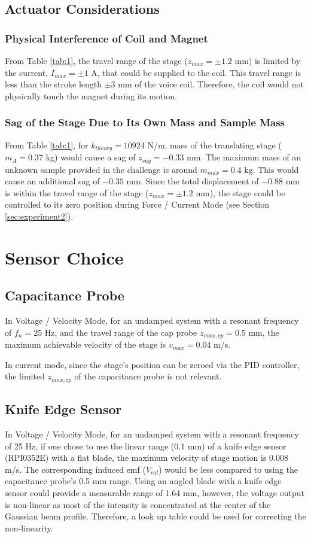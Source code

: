 \documentclass[12pt]{article}
\begin{document}
\subsection{Actuator Considerations}
\subsubsection{Physical Interference of Coil and Magnet}
From Table \ref{tab:1}, the travel range of the stage ($z_{max}= \pm 1.2$ mm) is limited by the current,  $I_{max}=\pm1$ A, that could be supplied to the coil. This travel range is less than the stroke length $\pm3$ mm \cite{hardwaremanual} of the voice coil. Therefore, the coil would not physically touch the magnet during its motion.  
\subsubsection{Sag of the Stage Due to Its Own Mass and Sample Mass}
From Table \ref{tab:1}, for $k_{theory}= 10924$ N/m, mass of the translating stage ($m_A  = 0.37$ kg) would cause a sag of $z_{sag}= - 0.33$ mm. The maximum mass of an unknown sample provided in the challenge is around $m_{max}= 0.4$ kg. This would cause an additional sag of $- 0.35$ mm.  Since the total displacement of $- 0.88$ mm is within the travel range of the stage ($z_{max}= \pm 1.2$ mm), the stage could be controlled to its zero position during Force / Current Mode (see Section \ref{sec:experiment2}).

\section{Sensor Choice}
\subsection{Capacitance Probe}
In Voltage / Velocity Mode, for an undamped system with a resonant frequency of $f_n = 25$ Hz, and the travel range of the cap probe $z_{max,cp}=0.5$ mm, the maximum achievable velocity of the stage is $v_{max}= 0.04$ m/s.

In current mode, since the stage’s position can be zeroed via the PID controller, the limited $z_{max,cp}$ of the capacitance probe is not relevant. 
\subsection{Knife Edge Sensor}
In Voltage / Velocity Mode, for an undamped system with a resonant frequency of 25 Hz, if one chose to use the linear range (0.1 mm) of a knife edge sensor (RPI0352E) with a flat blade, the maximum velocity of stage motion is 0.008 m/s. The corresponding induced emf ($V_{cal}$) would be less compared to using the capacitance probe’s 0.5 mm range. Using an angled blade with a knife edge sensor could provide a measurable range of 1.64 mm, however, the voltage output is non-linear as most of the intensity is concentrated at the center of the Gaussian beam profile. Therefore, a look up table could be used for correcting the non-linearity.
\end{document}
